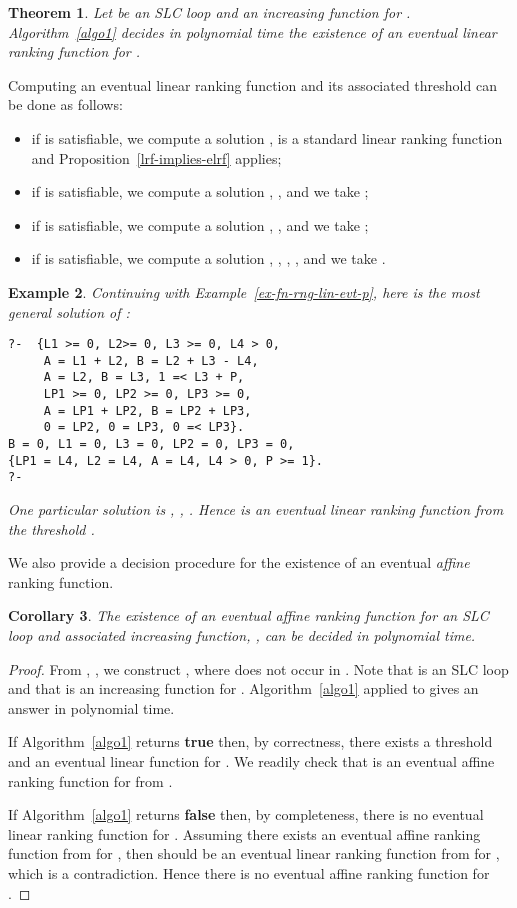 \documentclass{acm_proc_article-sp}
\newtheorem{theorem}{Theorem}[section]
\newtheorem{corollary}[theorem]{Corollary}
\newtheorem{example}[theorem]{Example}
\begin{document}
\begin{theorem}
\label{algo-is-a-decision-procedure-for-elrf}
Let  be an SLC loop and  an increasing function for .
\textup{Algorithm~\ref{algo1}} decides in polynomial time the existence
of an eventual linear ranking function for .
\end{theorem}

Computing an eventual linear ranking function 
and its associated threshold  can be done as follows:
\begin{itemize}
\item
if  is satisfiable,
we compute a solution ,
 is a standard linear ranking function
and Proposition~\ref{lrf-implies-elrf} applies;
\item
if  is satisfiable,
we compute a solution , , 
and we take ;
\item
if  is satisfiable,
we compute a solution , , 
and we take ;
\item
if  is satisfiable,
we compute a solution
, , , , 
and we take .
\end{itemize}

\begin{example}
Continuing with \textup{Example~\ref{ex-fn-rng-lin-evt-p}},
here is the most general solution of :
\begin{verbatim}
?-  {L1 >= 0, L2>= 0, L3 >= 0, L4 > 0,
     A = L1 + L2, B = L2 + L3 - L4,
     A = L2, B = L3, 1 =< L3 + P,
     LP1 >= 0, LP2 >= 0, LP3 >= 0,
     A = LP1 + LP2, B = LP2 + LP3,
     0 = LP2, 0 = LP3, 0 =< LP3}.
B = 0, L1 = 0, L3 = 0, LP2 = 0, LP3 = 0,
{LP1 = L4, L2 = L4, A = L4, L4 > 0, P >= 1}.
?-
\end{verbatim}
One particular solution is
,
,
.
Hence  is an eventual linear ranking function
from the threshold .
\end{example}

We also provide a decision procedure for the existence
of an eventual \emph{affine} ranking function.

\begin{corollary}
The existence of an eventual affine ranking function for
an SLC loop and associated increasing function, ,
can be decided in polynomial time.
\end{corollary}
\begin{proof}
From ,
,
we construct ,
 where  does not occur in .
Note that  is an SLC loop and that 
is an increasing function for .
Algorithm~\ref{algo1} applied to 
gives an answer in polynomial time.

If Algorithm~\ref{algo1} returns \textbf{true} then, by correctness,
there exists a threshold  and an eventual linear function
 for .
We readily check that 
is an eventual affine ranking function for  from .

If Algorithm~\ref{algo1} returns \textbf{false} then, by completeness,
there is no eventual linear ranking function for .
Assuming there exists an eventual affine ranking function
 from  for , then
 should be an
eventual linear ranking function from  for ,
which is a contradiction.
Hence there is no eventual affine ranking function for .
\end{proof}
\end{document}
